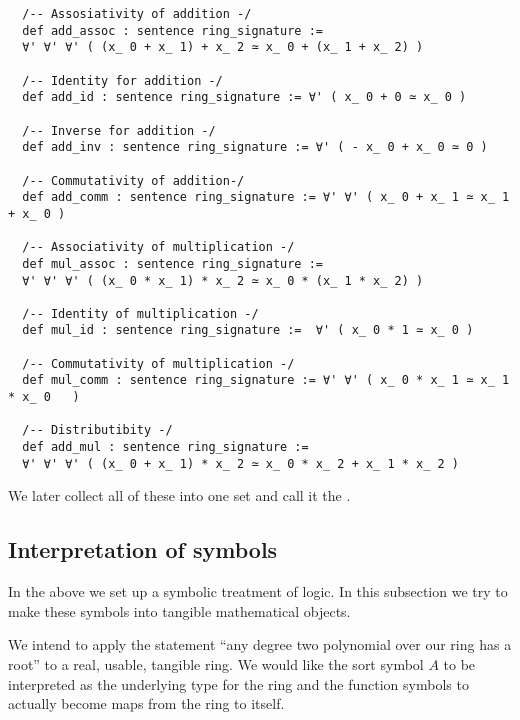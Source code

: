 \begin{lstlisting}
  /-- Assosiativity of addition -/
  def add_assoc : sentence ring_signature :=
  ∀' ∀' ∀' ( (x_ 0 + x_ 1) + x_ 2 ≃ x_ 0 + (x_ 1 + x_ 2) )

  /-- Identity for addition -/
  def add_id : sentence ring_signature := ∀' ( x_ 0 + 0 ≃ x_ 0 )

  /-- Inverse for addition -/
  def add_inv : sentence ring_signature := ∀' ( - x_ 0 + x_ 0 ≃ 0 )

  /-- Commutativity of addition-/
  def add_comm : sentence ring_signature := ∀' ∀' ( x_ 0 + x_ 1 ≃ x_ 1 + x_ 0 )

  /-- Associativity of multiplication -/
  def mul_assoc : sentence ring_signature :=
  ∀' ∀' ∀' ( (x_ 0 * x_ 1) * x_ 2 ≃ x_ 0 * (x_ 1 * x_ 2) )

  /-- Identity of multiplication -/
  def mul_id : sentence ring_signature :=  ∀' ( x_ 0 * 1 ≃ x_ 0 )

  /-- Commutativity of multiplication -/
  def mul_comm : sentence ring_signature := ∀' ∀' ( x_ 0 * x_ 1 ≃ x_ 1 * x_ 0   )

  /-- Distributibity -/
  def add_mul : sentence ring_signature :=
  ∀' ∀' ∀' ( (x_ 0 + x_ 1) * x_ 2 ≃ x_ 0 * x_ 2 + x_ 1 * x_ 2 )\end{lstlisting}

We later collect all of these into one set and call it the
.

\subsection{Interpretation of symbols}

In the above we set up a symbolic treatment of logic.
In this subsection we try to make these symbols into tangible mathematical objects.

We intend to apply the statement
``any degree two polynomial over our ring has a root''
to a real, usable, tangible ring.
We would like the sort symbol $A$ to be interpreted as the underlying type
for the ring and the function symbols to actually become maps from the ring to itself.

